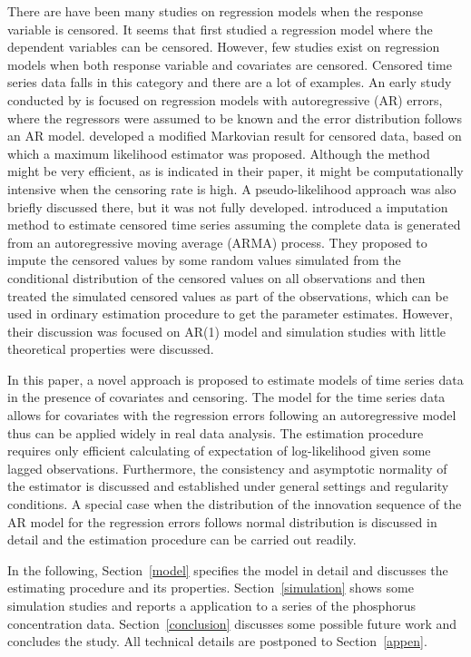 \documentclass[a4paper,12pt]{article}
\begin{document}
There are have been many studies on regression models when the response variable is censored. It seems that \citet{Buckley1979} first studied a regression model where the dependent variables can be censored.
However, few studies exist on regression models when both response variable and covariates are censored. Censored time series data falls in this category and there are a lot of examples. An early study conducted by \citet{ZegerBrookmeyer1986} is focused on regression models with autoregressive (AR) errors, where the regressors were assumed to be known and the error distribution follows an AR model. \citet{ZegerBrookmeyer1986} developed a modified Markovian result for censored data, based on which a maximum likelihood estimator was proposed. Although the method might be very efficient, as is indicated in their paper, it might be computationally intensive when the censoring rate is high. A pseudo-likelihood approach was also briefly discussed there, but it was not fully developed.
\citet{ParkGentonGhosh2007} introduced a imputation method to estimate censored time series assuming the complete data is generated from an autoregressive moving average (ARMA) process. They proposed to impute the censored values by some random values simulated from the conditional distribution of the censored values on all observations and then treated the simulated censored values as part of the observations, which can be used in ordinary estimation procedure to get the parameter estimates. However, their discussion was focused on AR(1) model and simulation studies with little theoretical properties were discussed.

In this paper, a novel approach is proposed to estimate models of time series data in the presence of covariates and censoring. The model for the time series data allows for covariates with the regression errors following an autoregressive model thus can be applied widely in real data analysis.
The estimation procedure requires only efficient calculating of expectation of log-likelihood given some lagged observations. Furthermore, the consistency and asymptotic normality of the estimator is discussed and established under general settings and regularity conditions. A special case when the distribution of the innovation sequence of the AR model for the regression errors follows normal distribution is discussed in detail and the estimation procedure can be carried out readily.

In the following, Section~\ref{model} specifies the model in detail and discusses the estimating procedure and its properties. Section~\ref{simulation} shows some simulation studies and reports a application to a series of the phosphorus concentration data. Section~\ref{conclusion} discusses some possible future work and concludes the study. All technical details are postponed to Section~\ref{appen}.
\end{document}
